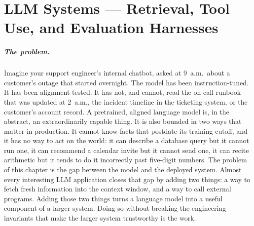 \chapter{LLM Systems --- Retrieval, Tool Use, and Evaluation Harnesses}
\label{chap:systems}

\scenelabel
\begin{scenestrip}
\end{scenestrip}

\paragraph{The problem.}
Imagine your support engineer's internal chatbot, asked at 9~a.m.\
about a customer's outage that started overnight. The model has
been instruction-tuned. It has been alignment-tested. It has not,
and cannot, read the on-call runbook that was updated at 2~a.m.,
the incident timeline in the ticketing system, or the customer's
account record. A pretrained, aligned language model is, in the
abstract, an extraordinarily capable thing. It is also bounded in two ways that
matter in production. It cannot know facts that postdate its
training cutoff, and it has no way to act on the world: it can
describe a database query but it cannot run one, it can recommend a
calendar invite but it cannot send one, it can recite arithmetic
but it tends to do it incorrectly past five-digit numbers. The
problem of this chapter is the gap between the model and the
deployed system. Almost every interesting LLM application closes
that gap by adding two things: a way to fetch fresh information into
the context window, and a way to call external programs. Adding
those two things turns a language model into a useful component of
a larger system. Doing so without breaking the engineering invariants
that make the larger system trustworthy is the work.

